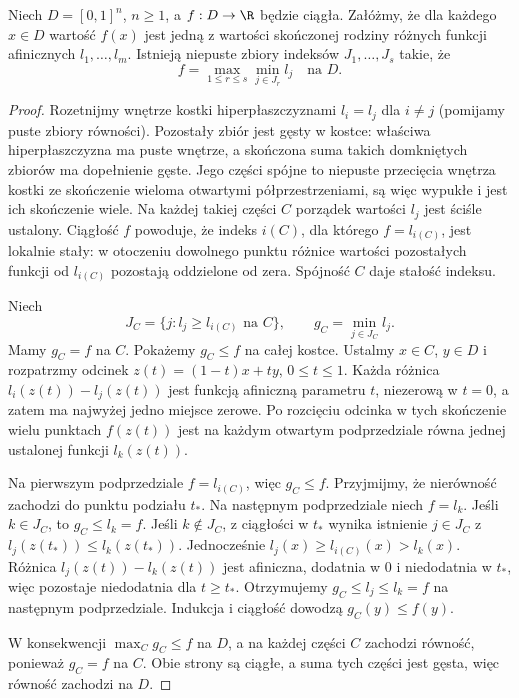 \begin{lemat}
\label{lem:lst-fuzzy-lattice-representation}
Niech $D=[0,1]^n$, $n\geq1$, a $f:D\to\R$ będzie ciągła.
Załóżmy, że dla każdego $x\in D$ wartość $f(x)$ jest jedną z wartości
skończonej rodziny różnych funkcji afinicznych $l_1,\ldots,l_m$.
Istnieją niepuste zbiory indeksów $J_1,\ldots,J_s$ takie, że
\[
 f=\max_{1\leq r\leq s}\min_{j\in J_r} l_j\quad\text{na }D.
\]
\end{lemat}
\begin{proof}
Rozetnijmy wnętrze kostki hiperpłaszczyznami $l_i=l_j$ dla $i\ne j$
(pomijamy puste zbiory równości). Pozostały zbiór jest gęsty w
kostce: właściwa hiperpłaszczyzna ma puste wnętrze, a skończona
suma takich domkniętych zbiorów ma dopełnienie gęste. Jego części
spójne to niepuste przecięcia wnętrza kostki ze skończenie wieloma
otwartymi półprzestrzeniami, są więc wypukłe i jest ich skończenie
wiele. Na każdej takiej części $C$ porządek wartości $l_j$ jest
ściśle ustalony. Ciągłość $f$ powoduje, że indeks $i(C)$, dla którego
$f=l_{i(C)}$, jest lokalnie stały: w otoczeniu dowolnego punktu
różnice wartości pozostałych funkcji od $l_{i(C)}$ pozostają
oddzielone od zera. Spójność $C$ daje stałość indeksu.

Niech
\[
 J_C=\{j:l_j\geq l_{i(C)}\text{ na }C\},\qquad
 g_C=\min_{j\in J_C}l_j.
\]
Mamy $g_C=f$ na $C$. Pokażemy $g_C\leq f$ na całej kostce.
Ustalmy $x\in C$, $y\in D$ i rozpatrzmy odcinek
$z(t)=(1-t)x+ty$, $0\leq t\leq1$. Każda różnica
$l_i(z(t))-l_j(z(t))$ jest funkcją afiniczną parametru $t$,
niezerową w $t=0$, a zatem ma najwyżej jedno miejsce zerowe.
Po rozcięciu odcinka w tych skończenie wielu punktach $f(z(t))$
jest na każdym otwartym podprzedziale równa jednej ustalonej
funkcji $l_k(z(t))$.

Na pierwszym podprzedziale $f=l_{i(C)}$, więc $g_C\leq f$.
Przyjmijmy, że nierówność zachodzi do punktu podziału $t_*$.
Na następnym podprzedziale niech $f=l_k$. Jeśli $k\in J_C$, to
$g_C\leq l_k=f$. Jeśli $k\notin J_C$, z ciągłości w $t_*$
wynika istnienie $j\in J_C$ z $l_j(z(t_*))\leq l_k(z(t_*))$.
Jednocześnie $l_j(x)\geq l_{i(C)}(x)>l_k(x)$. Różnica
$l_j(z(t))-l_k(z(t))$ jest afiniczna, dodatnia w $0$ i
niedodatnia w $t_*$, więc pozostaje niedodatnia dla $t\geq t_*$.
Otrzymujemy $g_C\leq l_j\leq l_k=f$ na następnym podprzedziale.
Indukcja i ciągłość dowodzą $g_C(y)\leq f(y)$.

W konsekwencji $\max_C g_C\leq f$ na $D$, a na każdej części $C$
zachodzi równość, ponieważ $g_C=f$ na $C$. Obie strony są ciągłe,
a suma tych części jest gęsta, więc równość zachodzi na $D$.
\end{proof}


